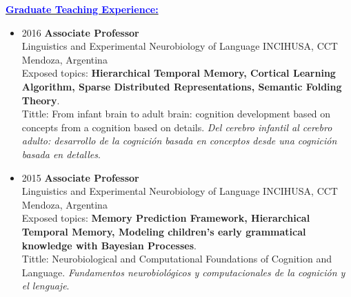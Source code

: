 \documentclass{article}
\newcommand{\statement}[1]{\par\medskip
  \underline{\textcolor{blue}{\textbf{#1:}}}\space
}
\begin{document}
\statement{Graduate Teaching Experience}
\begin{itemize}
	\item 2016 {\bf Associate Professor}\\
Linguistics and Experimental Neurobiology of Language INCIHUSA, CCT Mendoza, Argentina\\
Exposed topics: \textbf{Hierarchical Temporal Memory, Cortical Learning Algorithm, Sparse Distributed Representations, Semantic Folding Theory}.\\
Tittle: From infant brain to adult brain: cognition development based on concepts from a cognition based on details.
{\it Del cerebro infantil al cerebro adulto: desarrollo de la cognici\'on basada en conceptos desde una cognici\'on basada en detalles}.
	\item 2015 {\bf Associate Professor}\\
Linguistics and Experimental Neurobiology of Language INCIHUSA, CCT Mendoza, Argentina\\
Exposed topics: \textbf{Memory Prediction Framework, Hierarchical Temporal Memory,
Modeling children's early grammatical knowledge with Bayesian Processes}.\\
Tittle: Neurobiological and Computational Foundations of Cognition and Language.
{\it Fundamentos neurobiol\'ogicos y computacionales de la cognici\'on y el lenguaje}.
\end{itemize}
 
\end{document}
